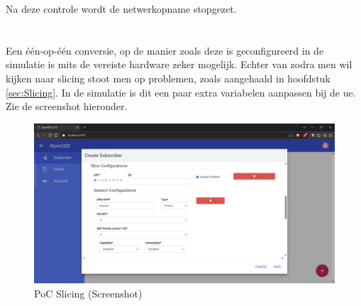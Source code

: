 Na deze controle wordt de netwerkopname stopgezet.

\section{}%
\label{sec:integration}%

Een \'{e}\'{e}n-op-\'{e}\'{e}n conversie, op de manier zoals deze is geconfigureerd in de simulatie is mits de vereiste hardware zeker mogelijk. Echter van zodra men wil kijken naar slicing stoot men op problemen, zoals aangehaald in hoofdstuk \ref{sec:Slicing}. In de simulatie is dit een paar extra variabelen aanpassen bij de \gls{ue}. Zie de screenshot hieronder.


\begin{figure}[H]
    \includegraphics[width=\linewidth]{../graphics/POC-Slicing.png}
    \caption{PoC Slicing (Screenshot)}
    \label{fig:pocSlicing}
\end{figure}

